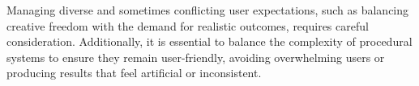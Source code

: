 Managing diverse and sometimes conflicting user expectations, such as balancing creative freedom with the demand for realistic outcomes, requires careful consideration. Additionally, it is essential to balance the complexity of procedural systems to ensure they remain user-friendly, avoiding overwhelming users or producing results that feel artificial or inconsistent.





